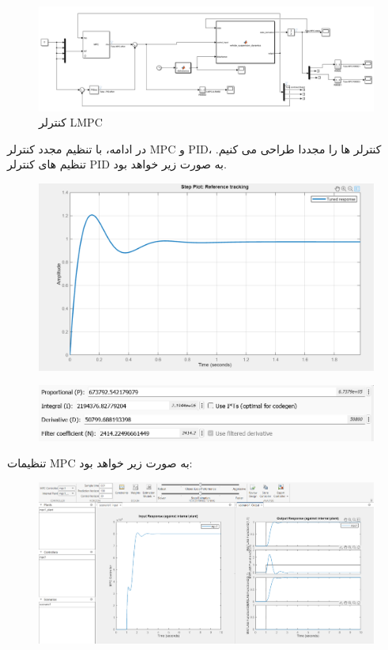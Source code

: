 \begin{figure}[H]
	\centering
	\includegraphics[width=1\linewidth]{../img/19}
	\caption{کنترلر LMPC}
	\label{fig:19}
\end{figure}
در ادامه، با تنظیم مجدد کنترلر MPC و PID، کنترلر ها را مجددا طراحی می کنیم. تنظیم های کنترلر PID به صورت زیر خواهد بود.
\begin{figure}[H]
	\centering
	\includegraphics[width=1\linewidth]{../img/20}
	\caption{}
	\label{fig:20}
\end{figure}

\begin{figure}[H]
	\centering
	\includegraphics[width=1\linewidth]{../img/21}
	\caption{}
	\label{fig:21}
\end{figure}
تنظیمات MPC به صورت زیر خواهد بود:

\begin{figure}[H]
	\centering
	\includegraphics[width=1\linewidth]{../img/22}
	\caption{}
	\label{fig:22}
\end{figure}

